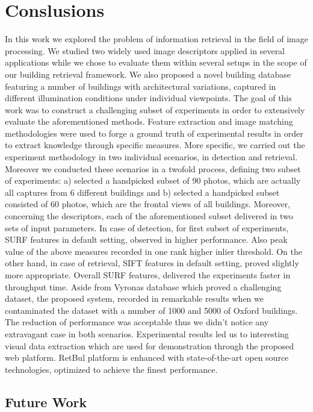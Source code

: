 \chapter{Conslusions}\label{conclusions}

In this work we explored the problem of information retrieval in the field of image processing. We studied two widely used image descriptors applied in several applications while we chose to evaluate them within several setups in the scope of our building retrieval framework.
We also proposed a novel building database featuring a number of buildings with architectural variations, captured in different illumination conditions under individual viewpoints. 
The goal of this work was to construct a challenging subset of experiments in order to extensively evaluate the aforementioned methods. Feature extraction and image matching methodologies were used to forge a ground truth of experimental results in order to extract knowledge through specific measures.
More specific, we carried out the experiment methodology in two individual scenarios, in detection and retrieval. Moreover we conducted these scenarios in a twofold process, defining two subset of experiments: a) selected a handpicked subset of 90 photos, which are actually all captures from 6 different buildings and b) selected a handpicked subset consisted of 60 photos, which are the frontal views of all buildings. Moreover, concerning the descriptors, each of the aforementioned subset delivered in two sets of input parameters.
In case of detection, for first subset of experiments, SURF features in default setting, observed in higher performance. Also peak value of the above measures recorded in one rank higher inlier threshold. On the other hand, in case of retrieval, SIFT features in default setting, proved slightly more appropriate.
Overall SURF features, delivered the experiments faster in throughput time.
Aside from Vyronas database which proved a challenging dataset, the proposed system, recorded in remarkable results when we contaminated the dataset with a number of 1000 and 5000 of Oxford buildings. The reduction of performance was acceptable thus we didn't notice any extravagant case in both scenarios.
Experimental results led us to interesting visual data extraction which are used for demonstration through the proposed web platform. RetBul platform is enhanced with state-of-the-art open source technologies, optimized to achieve the finest performance.


\section{Future Work}

